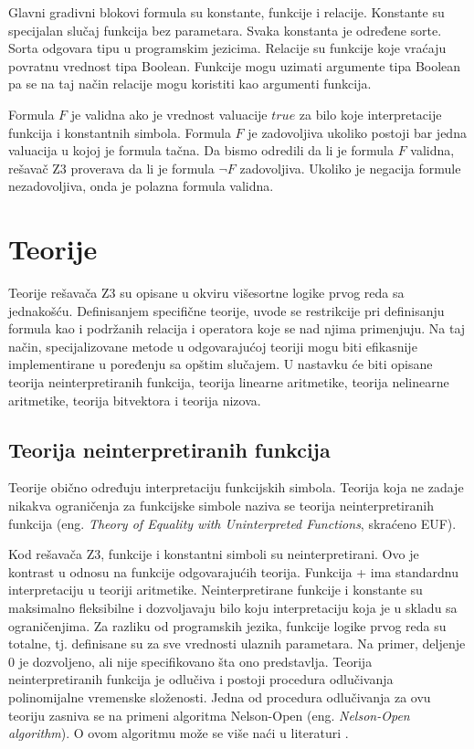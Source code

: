 \documentclass[12pt,oneside]{memoir}
\begin{document}
Glavni gradivni blokovi formula su konstante, funkcije i relacije. Konstante su specijalan slučaj funkcija bez parametara. Svaka konstanta je određene sorte. Sorta odgovara tipu u programskim jezicima. Relacije su funkcije koje vraćaju povratnu vrednost tipa Boolean. Funkcije mogu uzimati argumente tipa Boolean pa se na taj način relacije mogu koristiti kao argumenti funkcija.  


Formula $F$ je validna ako je vrednost valuacije $true$ za bilo koje interpretacije funkcija i konstantnih simbola. Formula $F$ je zadovoljiva ukoliko postoji bar jedna valuacija u kojoj je formula tačna. Da bismo odredili da li je formula $F$ validna, rešavač Z3 proverava da li je formula $\lnot F$ zadovoljiva. Ukoliko je negacija formule nezadovoljiva, onda je polazna formula validna. 



\section{Teorije} \label{sec:num2}
Teorije rešavača Z3 su opisane u okviru višesortne logike prvog reda sa jednakošću.  Definisanjem specifične teorije, uvode se restrikcije pri definisanju formula kao i podržanih relacija i operatora koje se nad njima primenjuju. Na taj način, specijalizovane metode u odgovarajućoj teoriji mogu biti efikasnije implementirane u poređenju sa opštim slučajem. U nastavku će biti opisane teorija neinterpretiranih funkcija, teorija linearne aritmetike, teorija nelinearne aritmetike, teorija bitvektora i teorija nizova.

\subsection{Teorija neinterpretiranih funkcija}
Teorije obično određuju interpretaciju funkcijskih simbola. Teorija koja ne zadaje nikakva ograničenja za funkcijske simbole naziva se teorija neinterpretiranih funkcija 
(eng. \textit{Theory of Equality with Uninterpreted Functions}, skraćeno EUF). \par Kod rešavača Z3, funkcije i konstantni simboli su neinterpretirani. Ovo je kontrast u odnosu na funkcije odgovarajućih teorija. Funkcija + ima standardnu interpretaciju u teoriji aritmetike. Neinterpretirane funkcije i konstante su maksimalno fleksibilne i dozvoljavaju bilo koju interpretaciju koja je u skladu sa ograničenjima. Za razliku od programskih jezika, funkcije logike prvog reda su totalne, tj. definisane su za sve vrednosti ulaznih parametara. Na primer, deljenje 0 je dozvoljeno, ali nije specifikovano šta ono predstavlja. Teorija neinterpretiranih funkcija je odlučiva i postoji procedura odlučivanja polinomijalne vremenske složenosti. Jedna od procedura odlučivanja za ovu teoriju zasniva se na primeni algoritma Nelson-Open (eng. \textit{Nelson-Open algorithm}). O ovom algoritmu može se više naći u literaturi \cite{NelsonOpen}.
\par
\end{document}

